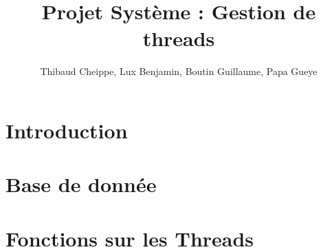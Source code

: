 \documentclass[a4paper,11pt]{report}
\title{Projet Système : Gestion de threads}
\author{Thibaud Cheippe, Lux Benjamin, Boutin Guillaume, Papa Gueye}
\begin{document}
\maketitle



\chapter*{Introduction}

\chapter{Base de donnée} 


\chapter{Fonctions sur les Threads}

\end{document}
